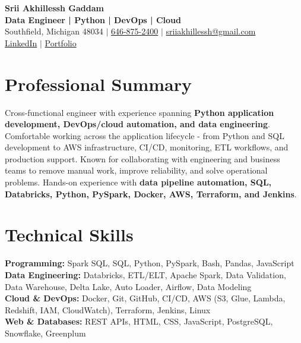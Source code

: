 \documentclass[letterpaper,10pt]{article}
\begin{document}
\fontsize{9.35pt}{10.45pt}\selectfont

\begin{center}
    {\LARGE \textbf{Srii Akhillessh Gaddam}} \\[-1pt]
    \textbf{Data Engineer | Python | DevOps | Cloud} \\[2pt]
    Southfield, Michigan 48034 $|$
    \href{tel:6468752400}{646-875-2400} $|$
    \href{mailto:sriiakhillessh@gmail.com}{sriiakhillessh@gmail.com} \\[1pt]
    \href{https://www.linkedin.com/in/srii-akhiilessh-gaddam-b48668191/}{LinkedIn} $|$
    \href{https://sriiakhillesshg.github.io/portfolio/}{Portfolio}
\end{center}
\vspace{-8pt}

\section{Professional Summary}
\small{Cross-functional engineer with experience spanning \textbf{Python application development, DevOps/cloud automation, and data engineering}. Comfortable working across the application lifecycle - from Python and SQL development to AWS infrastructure, CI/CD, monitoring, ETL workflows, and production support. Known for collaborating with engineering and business teams to remove manual work, improve reliability, and solve operational problems. Hands-on experience with \textbf{data pipeline automation, SQL, Databricks, Python, PySpark, Docker, AWS, Terraform, and Jenkins}.}

\section{Technical Skills}
\small{
\textbf{Programming:} Spark SQL, SQL, Python, PySpark, Bash, Pandas, JavaScript \\
\textbf{Data Engineering:} Databricks, ETL/ELT, Apache Spark, Data Validation, Data Warehouse, Delta Lake, Auto Loader, Airflow, Data Modeling \\
\textbf{Cloud \& DevOps:} Docker, Git, GitHub, CI/CD, AWS (S3, Glue, Lambda, Redshift, IAM, CloudWatch), Terraform, Jenkins, Linux \\
\textbf{Web \& Databases:} REST APIs, HTML, CSS, JavaScript, PostgreSQL, Snowflake, Greenplum
}
\end{document}
